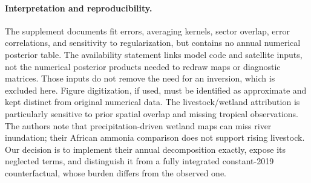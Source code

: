 \documentclass[11pt]{article}
\begin{document}
\paragraph{Interpretation and reproducibility.}
The supplement documents fit errors, averaging kernels, sector overlap,
error correlations, and sensitivity to regularization, but contains no
annual numerical posterior table. The availability statement links model
code and satellite inputs, not the numerical posterior products needed
to redraw maps or diagnostic matrices. Those inputs do not remove the
need for an inversion, which is excluded here. Figure digitization, if
used, must be identified as approximate and kept distinct from original
numerical data. The livestock/wetland attribution is particularly sensitive
to prior spatial overlap and missing tropical observations. The authors
note that precipitation-driven wetland maps can miss river inundation;
their African ammonia comparison does not support rising livestock.
Our decision is to implement their annual decomposition exactly, expose
its neglected terms, and distinguish it from a fully integrated
constant-2019 counterfactual, whose burden differs from the observed one.
\end{document}
